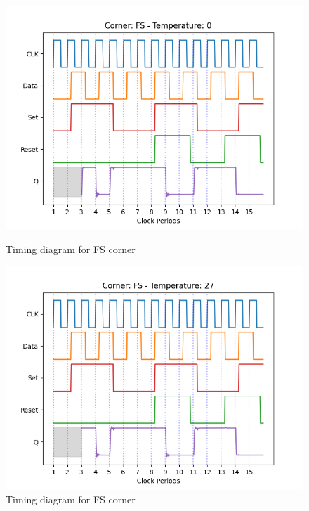 \begin{figure}[H]
    \begin{minipage}{0.5\textwidth}
        \centering
        \includegraphics[width=\textwidth]{Figures/Aimspice_Plots/FS_0.png}
        \caption{Timing diagram for FS corner}
        \label{fig:FS0}
    \end{minipage}%
    \begin{minipage}{0.5\textwidth}
        \centering
        \includegraphics[width=\textwidth]{Figures/Aimspice_Plots/FS_27.png}
        \caption{Timing diagram for FS corner}
        \label{fig:FS27}
    \end{minipage}
\end{figure}
